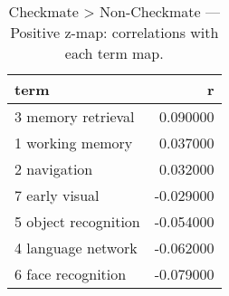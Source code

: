 \begin{table}
\caption{Checkmate > Non-Checkmate — Positive z-map: correlations with each term map.}
\label{tab:Checkmate > Non-Checkmate_pos}
\begin{tabular}{lr}
\toprule
term & r \\
\midrule
3 memory retrieval & 0.090000 \\
1 working memory & 0.037000 \\
2 navigation & 0.032000 \\
7 early visual & -0.029000 \\
5 object recognition & -0.054000 \\
4 language network & -0.062000 \\
6 face recognition & -0.079000 \\
\bottomrule
\end{tabular}
\end{table}

